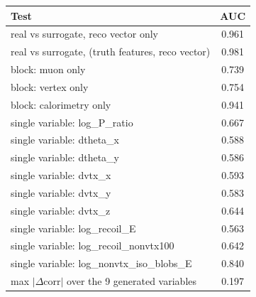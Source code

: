 \begin{tabular}{lc}
\toprule
Test & AUC \\
\midrule
real vs surrogate, reco vector only & 0.961 \\
real vs surrogate, (truth features, reco vector) & 0.981 \\
\midrule
block: muon only & 0.739 \\
block: vertex only & 0.754 \\
block: calorimetry only & 0.941 \\
single variable: log\_P\_ratio & 0.667 \\
single variable: dtheta\_x & 0.588 \\
single variable: dtheta\_y & 0.586 \\
single variable: dvtx\_x & 0.593 \\
single variable: dvtx\_y & 0.583 \\
single variable: dvtx\_z & 0.644 \\
single variable: log\_recoil\_E & 0.563 \\
single variable: log\_recoil\_nonvtx100 & 0.642 \\
single variable: log\_nonvtx\_iso\_blobs\_E & 0.840 \\
\midrule
max $|\Delta$corr$|$ over the 9 generated variables & 0.197 \\
\bottomrule
\end{tabular}

